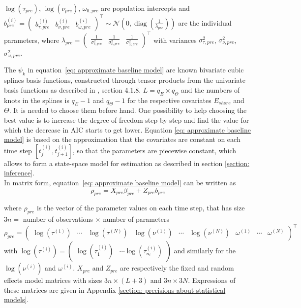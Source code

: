 \documentclass[11pt]{article}
\DeclareMathOperator{\diag}{diag}
\newcommand {\1}{\mathbb{1}}
\begin{document}
$\log(\tau_{pre})$, $\log(\nu_{pre})$, $\omega_{0,pre}$ are population intercepts and $b^{(i)}_{pre}=\begin{pmatrix} b_{\tau,pre}^{(i)} & b_{\nu,pre}^{(i)} & b_{\omega,pre}^{(i)} \end{pmatrix}^\top \sim \mathcal{N}\left( 0, \diag\left(\frac{1}{\lambda_{pre}}\right)\right)$
are the individual parameters, where $\lambda_{pre}=\begin{pmatrix} \frac{1}{\sigma_{\tau,pre}^2} & \frac{1}{\sigma_{\nu,pre}^2} & \frac{1}{\sigma_{\omega,pre}^2} \end{pmatrix}^\top$ with variances $\sigma_{\tau,pre}^2$, $\sigma_{\nu,pre}^2$, $\sigma_{\omega,pre}^2$.

The $\psi_k$ in equation~\ref{eq: approximate baseline model} are  known bivariate cubic splines basis functions, constructed through tensor products from the univariate basis functions as described in \cite{wood_generalized_2017}, section 4.1.8.
$L=q_E \times q_{\Theta}$ and the numbers of knots in the splines is $q_E-1$ and $q_{\Theta}-1$ for the respective covariates $E_{shore}$ and $\Theta$. It is needed to choose them before hand. One possibility to help choosing the best value is to increase the degree of freedom step by step  and find the value for which the decrease in AIC starts to get lower. Equation \ref{eq: approximate baseline model} is based on the approximation that the covariates are constant on each time step $[t_j^{(i)},t_{j+1}^{(i)}]$, so that the parameters are piecewise constant, which allows to form a state-space model for estimation as described in section \ref{section: inference}.\\
In matrix form, equation~\ref{eq: approximate baseline model} can be written as
\begin{equation}
	\rho_{pre}= X_{pre} \beta_{pre}
	+Z_{pre}b_{pre}
\end{equation}

where $\rho_{pre}$ is the vector of the parameter values on each time step, that has size $3n=$ number of observations $\times$ number of parameters  \[\rho_{pre}=\begin{pmatrix}
	\log(\tau^{(1)}) & \cdots & \log(\tau^{(N)}) & \log(\nu^{(1)}) &
	\cdots & \log(\nu^{(N)}) & \omega^{(1)}  &\cdots & \omega^{(N)}
\end{pmatrix}^\top\]
with $	\log(\tau^{(i)})=\begin{pmatrix} \log(\tau^{(i)}_1) & \cdots \log(\tau^{(i)}_{n_i})\end{pmatrix}$ and similarly for the $\log(\nu^{(i)})$ and $\omega^{(i)}$.
$X_{pre}$ and $Z_{pre}$ are respectively the fixed and random effects model matrices with sizes $3n \times (L+3)$ and $3n \times 3N$. Expressions of these matrices are given in Appendix \ref{section: precisions about statistical models}.
\end{document}
